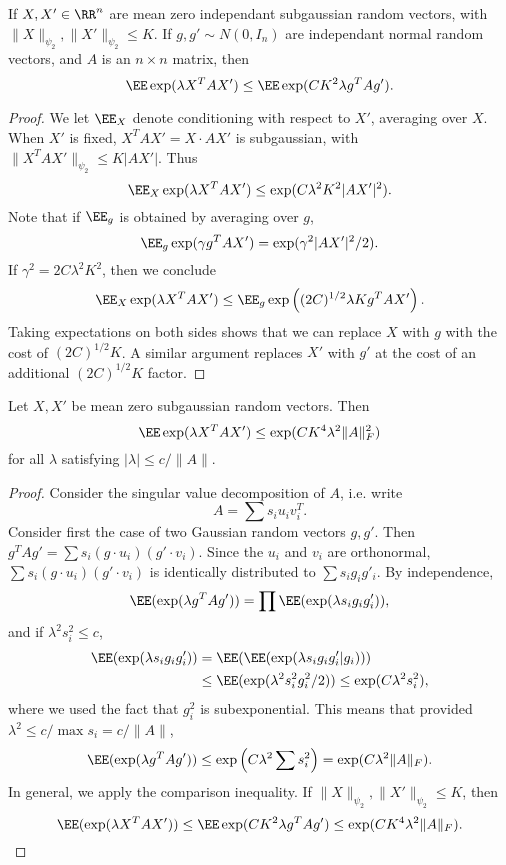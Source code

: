 \begin{lemma}
    If $X,X' \in \RR^n$ are mean zero independant subgaussian random vectors, with $\| X \|_{\psi_2}, \| X' \|_{\psi_2} \leq K$. If $g,g' \sim N(0,I_n)$ are independant normal random vectors, and $A$ is an $n \times n$ matrix, then
    \[ \EE \exp(\lambda X^T A X') \leq \EE \exp(C K^2 \lambda g^T A g'). \]
\end{lemma}
\begin{proof}
    We let $\EE_X$ denote conditioning with respect to $X'$, averaging over $X$. When $X'$ is fixed, $X^T A X' = X \cdot AX'$ is subgaussian, with $\| X^T A X' \|_{\psi_2} \leq K |AX'|$. Thus
    \[ \EE_X \exp(\lambda X^T A X') \leq \exp(C \lambda^2 K^2 |AX'|^2). \]
    Note that if $\EE_g$ is obtained by averaging over $g$,
    \[ \EE_g \exp(\gamma g^T A X') = \exp(\gamma^2 |AX'|^2/2). \]
    If $\gamma^2 = 2C \lambda^2 K^2$, then we conclude
    \[ \EE_X \exp(\lambda X^T A X') \leq \EE_g \exp \left( (2C)^{1/2} \lambda K g^T A X' \right). \]
    Taking expectations on both sides shows that we can replace $X$ with $g$ with the cost of $(2C)^{1/2} K$. A similar argument replaces $X'$ with $g'$ at the cost of an additional $(2C)^{1/2} K$ factor.
\end{proof}

\begin{lemma}
    Let $X,X'$ be mean zero subgaussian random vectors. Then
    \[ \EE \exp(\lambda X^TAX') \leq \exp(C K^4 \lambda^2 \| A \|_F^2) \]
    for all $\lambda$ satisfying $|\lambda| \leq c/\|A\|$.
\end{lemma}
\begin{proof}
    Consider the singular value decomposition of $A$, i.e. write
    \[ A = \sum s_i u_i v_i^T. \]
    Consider first the case of two Gaussian random vectors $g,g'$. Then $g^T Ag' = \sum s_i (g \cdot u_i)(g' \cdot v_i)$. Since the $u_i$ and $v_i$ are orthonormal, $\sum s_i (g \cdot u_i)(g' \cdot v_i)$ is identically distributed to $\sum s_i g_i g'_i$. By independence,
    \[ \EE(\exp(\lambda g^T A g')) = \prod \EE(\exp(\lambda s_i g_i g'_i)), \]
    and if $\lambda^2 s_i^2 \leq c$,
    \begin{align*}
        \EE(\exp(\lambda s_i g_i g'_i)) &= \EE(\EE(\exp(\lambda s_i g_i g'_i | g_i)))\\
        &\leq \EE(\exp(\lambda^2 s_i^2 g_i^2/2)) \leq \exp(C \lambda^2 s_i^2),
    \end{align*}
    where we used the fact that $g_i^2$ is subexponential. This means that provided $\lambda^2 \leq c / \max s_i = c / \| A \|$,
    \[ \EE(\exp(\lambda g^T A g')) \leq \exp \left( C \lambda^2 \sum s_i^2 \right) = \exp(C \lambda^2 \| A \|_F). \]
    In general, we apply the comparison inequality. If $\| X \|_{\psi_2}, \| X' \|_{\psi_2} \leq K$, then
    \[ \EE(\exp(\lambda X^T A X')) \leq \EE \exp(C K^2 \lambda g^T A g') \leq \exp(C K^4 \lambda^2 \| A \|_F). \qedhere \]
\end{proof}

